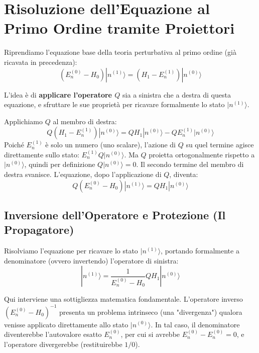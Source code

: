 \section{Risoluzione dell'Equazione al Primo Ordine tramite Proiettori}

Riprendiamo l'equazione base della teoria perturbativa al primo ordine (già ricavata in precedenza):
\begin{equation}
\left( E_n^{(0)} - H_0 \right) |n^{(1)}\rangle = \left( H_1 - E_n^{(1)} \right) |n^{(0)}\rangle
\end{equation}

L'idea è di \textbf{applicare l'operatore $Q$} sia a sinistra che a destra di questa equazione, e sfruttare le sue proprietà per ricavare formalmente lo stato $\vert{}n^{(1)}\rangle$.

Applichiamo $Q$ al membro di destra:
\begin{equation}
Q \left( H_1 - E_n^{(1)} \right) |n^{(0)}\rangle = Q H_1 |n^{(0)}\rangle - Q E_n^{(1)} |n^{(0)}\rangle
\end{equation}
Poiché $E_n^{(1)}$ è solo un numero (uno scalare), l'azione di $Q$ su quel termine agisce direttamente sullo stato: $E_n^{(1)} Q \vert{}n^{(0)}\rangle$. Ma $Q$ proietta ortogonalmente rispetto a $\vert{}n^{(0)}\rangle$, quindi per definizione $Q \vert{}n^{(0)}\rangle = 0$. Il secondo termine del membro di destra svanisce.
L'equazione, dopo l'applicazione di $Q$, diventa:
\begin{equation}
Q \left( E_n^{(0)} - H_0 \right) |n^{(1)}\rangle = Q H_1 |n^{(0)}\rangle
\end{equation}

\subsection{Inversione dell'Operatore e Protezione (Il Propagatore)}
Risolviamo l'equazione per ricavare lo stato $\vert{}n^{(1)}\rangle$, portando formalmente a denominatore (ovvero invertendo) l'operatore di sinistra:
\begin{equation}
|n^{(1)}\rangle = \frac{1}{E_n^{(0)} - H_0} Q H_1 |n^{(0)}\rangle
\end{equation}

Qui interviene una sottigliezza matematica fondamentale. L'operatore inverso $(E_n^{(0)} - H_0)^{-1}$ presenta un problema intrinseco (una "divergenza") qualora venisse applicato direttamente allo stato $\vert{}n^{(0)}\rangle$. In tal caso, il denominatore diventerebbe l'autovalore esatto $E_n^{(0)}$, per cui si avrebbe $E_n^{(0)} - E_n^{(0)} = 0$, e l'operatore divergerebbe (restituirebbe $1/0$).

